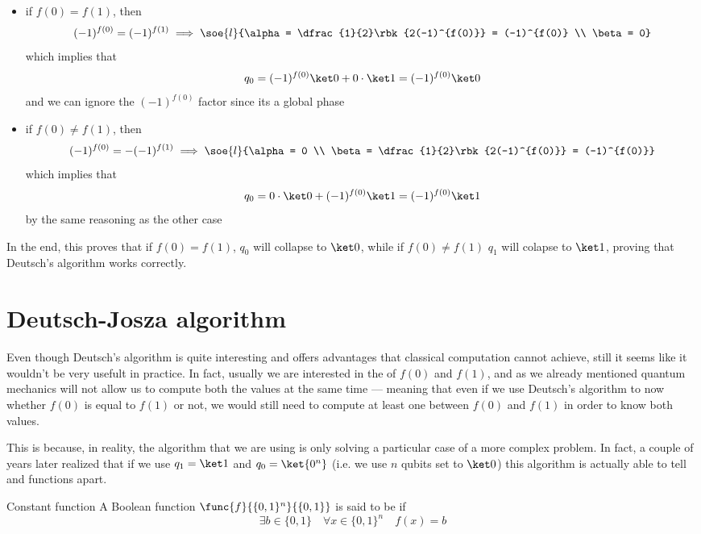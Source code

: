 \documentclass[a4paper, 12pt]{report}
\begin{document}
\begin{itemize}
    \item if $f(0) = f(1)$, then $$(-1)^{f(0)} = (-1)^{f(1)} \implies \soe{l}{\alpha = \dfrac{1}{2}\rbk{2(-1)^{f(0)}} = (-1)^{f(0)} \\ \beta = 0}$$ which implies that $$q_0 = (-1)^{f(0)} \ket 0 + 0 \cdot \ket 1 = (-1)^{f(0)} \ket 0$$ and we can ignore the $(-1)^{f(0)}$ factor since its a global phase
    \item if $f(0) \neq f(1)$, then $$(-1)^{f(0)} = - (-1)^{f(1)} \implies \soe{l}{\alpha = 0 \\ \beta = \dfrac{1}{2}\rbk{2(-1)^{f(0)}} = (-1)^{f(0)}}$$ which implies that $$q_0 = 0 \cdot \ket 0 + (-1)^{f(0)} \ket 1 = (-1)^{f(0)} \ket 1$$ by the same reasoning as the other case
\end{itemize}

In the end, this proves that if $f(0) = f(1)$, $q_0$ will collapse to $\ket 0$, while if $f(0) \neq f(1)$ $q_1$ will colapse to $\ket 1$, proving that Deutsch's algorithm works correctly.

\section{Deutsch-Josza algorithm}

Even though Deutsch's algorithm is quite interesting and offers advantages that classical computation cannot achieve, still it seems like it wouldn't be very usefult in practice. In fact, usually we are interested in the  of $f(0)$ and $f(1)$, and as we already mentioned quantum mechanics will not allow us to compute both the values at the same time --- meaning that even if we use Deutsch's algorithm to now whether $f(0)$ is equal to $f(1)$ or not, we would still need to compute at least one between $f(0)$ and $f(1)$ in order to know both values.

This is because, in reality, the algorithm that we are using is only solving a particular case of a more complex problem. In fact, a couple of years later \textcite{dj} realized that if we use $q_1 = \ket 1$ and $q_0 = \ket{0^n}$ (i.e. we use $n$ qubits set to $\ket 0$) this algorithm is actually able to tell  and  functions apart.

\begin{frameddefn}{Constant function}
    A Boolean function $\func{f}{\{0, 1\}^n}{\{0,1\}}$ is said to be  if $$\exists b \in \{0, 1\} \quad \forall x \in \{0, 1\}^n \quad f(x) = b$$
\end{frameddefn}
\end{document}
